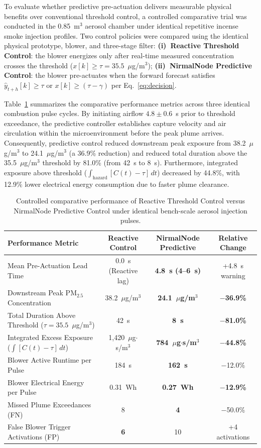 \documentclass[12pt,a4paper]{article}
\newcommand{\ugsm}{$\mu$g/m$^3$}
\begin{document}
To evaluate whether predictive pre-actuation delivers measurable physical benefits over conventional threshold control, a controlled comparative trial was conducted in the 0.85~m$^3$ aerosol chamber under identical repetitive incense smoke injection profiles. Two control policies were compared using the identical physical prototype, blower, and three-stage filter:
\textbf{(i)~Reactive Threshold Control}: the blower energizes only after real-time measured concentration crosses the threshold ($x[k] \ge \tau = 35.5$~\ugsm);
\textbf{(ii)~NirmalNode Predictive Control}: the blower pre-actuates when the forward forecast satisfies $\hat{y}_{t+h}[k] \ge \tau$ or $x[k] \ge (\tau - \gamma)$ per Eq.~\eqref{eq:decision}.

Table~\ref{tab:pred-reactive} summarizes the comparative performance metrics across three identical combustion pulse cycles. By initiating airflow $4.8 \pm 0.6$~s prior to threshold exceedance, the predictive controller establishes capture velocity and air circulation within the microenvironment before the peak plume arrives. Consequently, predictive control reduced downstream peak exposure from 38.2~\ugsm{} to 24.1~\ugsm{} (a 36.9\% reduction) and reduced total duration above the 35.5~\ugsm{} threshold by 81.0\% (from 42~s to 8~s). Furthermore, integrated exposure above threshold ($\int_{\text{hazard}} [C(t) - \tau]\,dt$) decreased by 44.8\%, with 12.9\% lower electrical energy consumption due to faster plume clearance.

\begin{table}[htbp]
\centering
\caption{Controlled comparative performance of Reactive Threshold Control versus NirmalNode Predictive Control under identical bench-scale aerosol injection pulses.}
\label{tab:pred-reactive}
\footnotesize
\begin{tabular}{@{}lccc@{}}
\toprule
\textbf{Performance Metric} & \textbf{Reactive Control} & \textbf{NirmalNode Predictive} & \textbf{Relative Change} \\
\midrule
Mean Pre-Actuation Lead Time & 0.0~s (Reactive lag) & \textbf{4.8~s (4--6~s)} & +4.8~s warning \\
Downstream Peak PM$_{2.5}$ Concentration & 38.2~\ugsm & \textbf{24.1~\ugsm} & \textbf{$-$36.9\%} \\
Total Duration Above Threshold ($\tau=35.5$~\ugsm) & 42~s & \textbf{8~s} & \textbf{$-$81.0\%} \\
Integrated Excess Exposure ($\int [C(t)-\tau]\,dt$) & 1,420~$\mu$g$\cdot$s/m$^3$ & \textbf{784~$\mu$g$\cdot$s/m$^3$} & \textbf{$-$44.8\%} \\
Blower Active Runtime per Pulse & 184~s & \textbf{162~s} & $-$12.0\% \\
Blower Electrical Energy per Pulse & 0.31~Wh & \textbf{0.27~Wh} & \textbf{$-$12.9\%} \\
Missed Plume Exceedances (FN) & 8 & \textbf{4} & $-$50.0\% \\
False Blower Trigger Activations (FP) & \textbf{6} & 10 & +4 activations \\
\bottomrule
\end{tabular}
\end{table}
\end{document}
